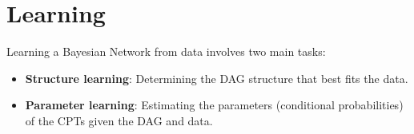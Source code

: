 \section{Learning}

Learning a Bayesian Network from data involves two main tasks:

\begin{itemize}
    \item \textbf{Structure learning}: Determining the DAG structure
      that best fits the data.
    \item \textbf{Parameter learning}: Estimating the parameters
      (conditional probabilities) of the CPTs given the DAG and data.
\end{itemize}
